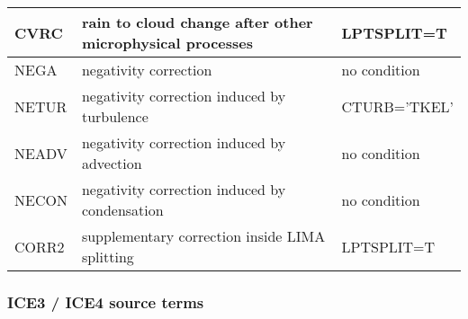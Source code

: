 \begin{longtable} {|p{}|p{}|p{}|}
CVRC   & rain to cloud change after other microphysical processes & LPTSPLIT=T \\\hline
NEGA   & negativity correction                                    & no condition \\\hline
NETUR  & negativity correction induced by turbulence              & CTURB='TKEL' \\\hline
NEADV  & negativity correction induced by advection               & no condition \\\hline
NECON  & negativity correction induced by condensation            & no condition \\\hline
CORR2  & supplementary correction inside LIMA splitting           & LPTSPLIT=T \\\hline
\end{longtable}

\subsubsection{ICE3 / ICE4 source terms}

